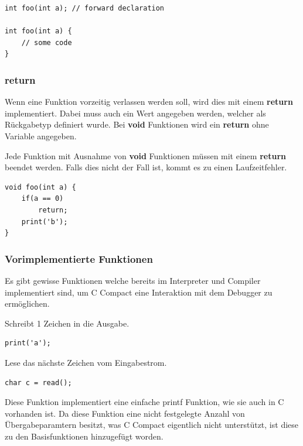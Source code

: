 \begin{lstlisting}[language=CMM]
int foo(int a); // forward declaration

int foo(int a) {
	// some code
}
\end{lstlisting}

\subsubsection{return}

Wenn eine Funktion vorzeitig verlassen werden soll, wird dies mit einem \textbf{return} implementiert. Dabei muss auch ein Wert angegeben werden, welcher als R\"uckgabetyp definiert wurde. Bei \textbf{void} Funktionen wird ein \textbf{return} ohne Variable angegeben.

Jede Funktion mit Ausnahme von \textbf{void} Funktionen m\"ussen mit einem \textbf{return} beendet werden. Falls dies nicht der Fall ist, kommt es zu einen Laufzeitfehler.

\begin{lstlisting}[language=CMM]
void foo(int a) {
	if(a == 0)
		return;
	print('b');
}
\end{lstlisting}

\subsubsection{Vorimplementierte Funktionen}

Es gibt gewisse Funktionen welche bereits im Interpreter und Compiler implementiert sind, um C Compact eine Interaktion mit dem Debugger zu erm\"oglichen.


Schreibt 1 Zeichen in die Ausgabe. 

\begin{lstlisting}[language=CMM]
print('a');
\end{lstlisting}


Lese das n\"achste Zeichen vom Eingabestrom.

\begin{lstlisting}[language=CMM]
char c = read();
\end{lstlisting}


Diese Funktion implementiert eine einfache printf Funktion, wie sie auch in C vorhanden  ist. Da diese Funktion eine nicht festgelegte Anzahl von \"Ubergabeparamtern besitzt, was C Compact eigentlich nicht unterst\"utzt, ist diese zu den Basisfunktionen hinzugef\"ugt worden.

